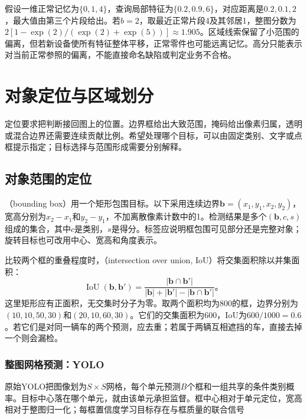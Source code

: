 假设一维正常记忆为$\{0,1,4\}$，查询局部特征为$\{0.2,0.9,6\}$，对应距离是$0.2,0.1,2$，最大值由第三个片段给出。若$b=2$，取最近正常片段4及其邻居1，整图分数为$2[1-\exp(2)/(\exp(2)+\exp(5))]\approx1.905$。区域线索保留了小范围的偏离，但若新设备使所有特征整体平移，正常零件也可能远离记忆。高分只能表示对当前正常参照的偏离，不能直接命名缺陷或判定业务不合格。

\section{对象定位与区域划分}
\label{sec:vision-recognition-regions}

定位要求把判断接回图上的位置。边界框给出大致范围，掩码给出像素归属，透明或混合边界还需要连续贡献比例。希望处理哪个目标，可以由固定类别、文字或点框提示指定；目标选择与范围形成需要分别解释。

\subsection{对象范围的定位}
\label{sec:vision-recognition-detection}

（bounding box）用一个矩形包围目标。以下采用连续边界$\bm{b}=(x_1,y_1,x_2,y_2)$，宽高分别为$x_2-x_1$和$y_2-y_1$，不加离散像素计数中的1。检测结果是多个$(\bm{b},c,s)$组成的集合，其中$c$是类别，$s$是得分。标签应说明框包围可见部分还是完整对象；旋转目标也可改用中心、宽高和角度表示。

比较两个框的重叠程度时，（intersection over union, IoU）将交集面积除以并集面积：
\begin{equation}
 \operatorname{IoU}(\bm{b},\bm{b}')
 =\frac{|\bm{b}\cap\bm{b}'|}
 {|\bm{b}|+|\bm{b}'|-|\bm{b}\cap\bm{b}'|}\text{。}
 \label{eq:vision-iou}
\end{equation}
这里矩形应有正面积，无交集时分子为零。取两个面积均为800的框，边界分别为$(10,10,50,30)$和$(20,10,60,30)$。它们的交集面积为600，IoU为$600/1000=0.6$。若它们是对同一辆车的两个预测，应去重；若属于两辆互相遮挡的车，直接去掉一个则会漏检。

\subsubsection{整图网格预测：YOLO}
\label{sec:vision-recognition-yolo}

原始YOLO把图像划为$S\times S$网格，每个单元预测$B$个框和一组共享的条件类别概率。目标中心落在哪个单元，就由该单元承担监督。框中心相对于单元定位，宽高相对于整图归一化；每框置信度学习目标存在与框质量的联合信号

